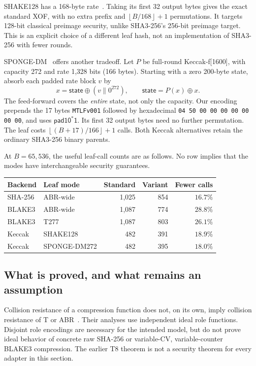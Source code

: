\documentclass[11pt,letterpaper]{article}
\theoremstyle{definition} %
\newcommand{\floor}[1]{\ensuremath{\left\lfloor#1\right\rfloor}}
\newcommand{\concat}{\|}
\begin{document}
SHAKE128 has a 168-byte rate~\cite{FIPS202}. Taking its first 32 output
bytes gives the exact standard XOF, with no extra prefix and
$\floor{B/168}+1$ permutations. It targets 128-bit classical preimage
security, unlike SHA3-256's 256-bit preimage target. This is an explicit
choice of a different leaf hash, not an implementation of SHA3-256 with
fewer rounds.

SPONGE-DM~\cite{SPONGEDM} offers another tradeoff. Let $P$ be full-round
Keccak-f[1600], with capacity 272 and rate 1,328 bits (166 bytes).
Starting with a zero 200-byte state, absorb each padded rate block $v$ by
\[
 x=\mathsf{state}\oplus(v\concat0^{272}),\qquad
 \mathsf{state}=P(x)\oplus x.
\]
The feed-forward covers the \emph{entire} state, not only the capacity.
Our encoding prepends the 17 bytes
\texttt{MTLFv001} followed by hexadecimal
\texttt{04 50 00 00 00 00 00 00 00}, and uses $\mathsf{pad10^*1}$.
Its first 32 output bytes need no further permutation. The leaf costs
$\floor{(B+17)/166}+1$ calls. Both Keccak alternatives retain the
ordinary SHA3-256 binary parents.

At $B=65{,}536$, the useful leaf-call counts are as follows. No row implies
that the modes have interchangeable security guarantees.
\begin{center}
\small
\begin{tabular}{@{}llrrr@{}}
\toprule
Backend & Leaf mode & Standard & Variant & Fewer calls\\
\midrule
SHA-256 & ABR-wide & 1,025 & 854 & $16.7\%$\\
BLAKE3 & ABR-wide & 1,087 & 774 & $28.8\%$\\
BLAKE3 & T277 & 1,087 & 803 & $26.1\%$\\
Keccak & SHAKE128 & 482 & 391 & $18.9\%$\\
Keccak & SPONGE-DM272 & 482 & 395 & $18.0\%$\\
\bottomrule
\end{tabular}
\end{center}

\subsection{What is proved, and what remains an assumption}
\label{sec:concrete-security}
Collision resistance of a compression function does not, on its own,
imply collision resistance of T or ABR~\cite{CN24}. Their analyses use
independent ideal role functions. Disjoint role encodings are necessary
for the intended model, but do not prove ideal behavior of concrete raw
SHA-256 or variable-CV, variable-counter BLAKE3 compression. The earlier
T8 theorem is not a security theorem for every adapter in this section.
\end{document}
